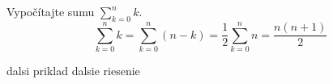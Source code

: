 \pr Vypočítajte sumu $\sum_{k=0}^n k$.
 $$\sum_{k=0}^n k = \sum_{k=0}^n \left(n-k\right) = \frac12 \sum_{k=0}^n n=\frac{n(n+1)}{2}$$

\pr dalsi priklad
 dalsie riesenie

